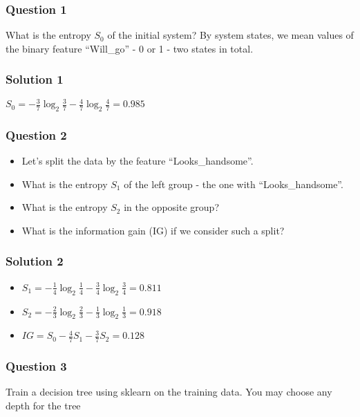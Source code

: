 \begin{frame}[fragile]\frametitle{Question 1}	
What is the entropy  $S_0$  of the initial system? By system states, we mean values of the binary feature ``Will\_go'' - 0 or 1 - two states in total.
\end{frame}

\begin{frame}[fragile]\frametitle{Solution 1}	
$S_0 = -\frac{3}{7}\log_2{\frac{3}{7}}-\frac{4}{7}\log_2{\frac{4}{7}} = 0.985$
\end{frame}

\begin{frame}[fragile]\frametitle{Question 2}	
\begin{itemize}
\item Let's split the data by the feature ``Looks\_handsome''. 
\item  What is the entropy  $S_1$  of the left group - the one with ``Looks\_handsome''. 
 \item What is the entropy  $S_2$  in the opposite group? 
 \item What is the information gain (IG) if we consider such a split?
\end{itemize}
 
 \end{frame}

\begin{frame}[fragile]\frametitle{Solution 2}	
\begin{itemize}
\item $S_1 = -\frac{1}{4}\log_2{\frac{1}{4}}-\frac{3}{4}\log_2{\frac{3}{4}} = 0.811$
 \item $S_2 = -\frac{2}{3}\log_2{\frac{2}{3}}-\frac{1}{3}\log_2{\frac{1}{3}} = 0.918$
 \item $IG = S_0-\frac{4}{7}S_1-\frac{3}{7}S_2 = 0.128$
\end{itemize}
\end{frame}


\begin{frame}[fragile]\frametitle{Question 3}	
Train a decision tree using sklearn on the training data. You may choose any depth for the tree
 
 \end{frame}

